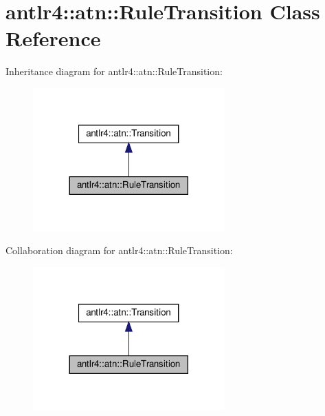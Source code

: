 \hypertarget{classantlr4_1_1atn_1_1RuleTransition}{}\section{antlr4\+:\+:atn\+:\+:Rule\+Transition Class Reference}
\label{classantlr4_1_1atn_1_1RuleTransition}


Inheritance diagram for antlr4\+:\+:atn\+:\+:Rule\+Transition\+:
\nopagebreak
\begin{figure}[H]
\begin{center}
\leavevmode
\includegraphics[width=209pt]{classantlr4_1_1atn_1_1RuleTransition__inherit__graph}
\end{center}
\end{figure}


Collaboration diagram for antlr4\+:\+:atn\+:\+:Rule\+Transition\+:
\nopagebreak
\begin{figure}[H]
\begin{center}
\leavevmode
\includegraphics[width=209pt]{classantlr4_1_1atn_1_1RuleTransition__coll__graph}
\end{center}
\end{figure}
